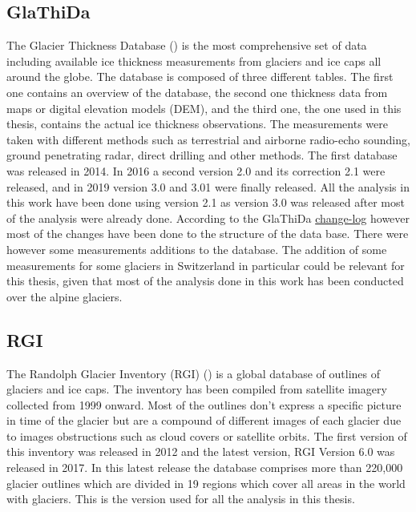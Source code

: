 \subsection{GlaThiDa}
The Glacier Thickness Database (\citet{GlaThiDa2014}) is the most comprehensive set of data including available ice thickness measurements from glaciers and ice caps all around the globe. The database is composed of three different tables. The first one contains an overview of the database, the second one thickness data from maps or digital elevation models (DEM), and the third one, the one used in this thesis, contains the actual ice thickness observations. The measurements were taken with different methods such as terrestrial and airborne radio-echo sounding, ground penetrating radar, direct drilling and other methods. The first database was released in 2014. In 2016 a second version 2.0 and its correction 2.1 were released, and in 2019 version 3.0 and 3.01 were finally released. All the analysis in this work have been done using version 2.1 as version 3.0 was released after most of the analysis were already done. According to the GlaThiDa \href{https://github.com/ezwelty/glathida/blob/master/CHANGELOG.md}{change-log} however most of the changes have been done to the structure of the data base. There were however some measurements additions to the database. The addition of some measurements for some glaciers in Switzerland in particular could be relevant for this thesis, given that most of the analysis done in this work has been conducted over the alpine glaciers. 

\subsection{RGI}
The Randolph Glacier Inventory (RGI) (\citet{RGI2014}) is a global database of outlines of glaciers and ice caps. The inventory has been compiled from satellite imagery collected from 1999 onward. Most of the outlines don't express a specific picture in time of the glacier but are a compound of different images of each glacier due to images obstructions such as cloud covers or satellite orbits. The first version of this inventory was released in 2012 and the latest version, RGI Version 6.0 was released in 2017. In this latest release the database comprises more than 220,000 glacier outlines which are divided in 19 regions which cover all areas in the world with glaciers. This is the version used for all the analysis in this thesis. 


